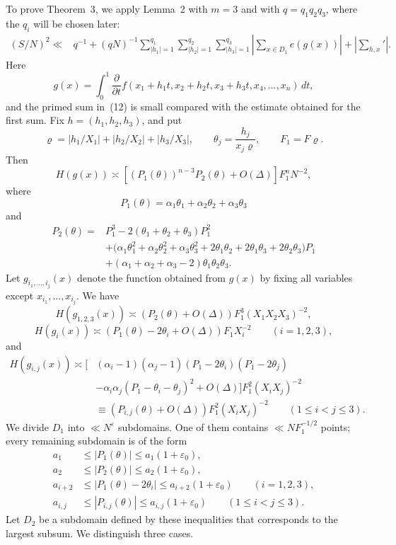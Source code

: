 \documentclass[10pt]{article}
\begin{document}
To prove Theorem~3, we apply Lemma~2 with $m=3$ and with
$q=q_1q_2q_3$, where the $q_i$ will be chosen later:
\begin{equation}
\begin{aligned}
  (S/N)^2\ll{}&q^{-1}+(qN)^{-1}
  \sum_{|h_1|=1}^{q_1}\sum_{|h_2|=1}^{q_2}\sum_{|h_3|=1}^{q_3}
  \left|\sum_{x\in D_1}e(g(x))\right|
  +\left|\sum_{h,x}'\right|.
\end{aligned}
\tag{12}
\end{equation}
Here
\[
  g(x)=\int_0^1\frac{\partial}{\partial t}
  f(x_1+h_1t,x_2+h_2t,x_3+h_3t,x_4,\ldots,x_n)\,dt,
\]
and the primed sum in~(12) is small compared with the estimate obtained for the first sum. Fix $h=(h_1,h_2,h_3)$, and put
\[
  \varrho=|h_1/X_1|+|h_2/X_2|+|h_3/X_3|,
  \qquad \theta_j=\frac{h_j}{x_j\varrho},
  \qquad F_1=F\varrho.
\]
Then
\[
  H(g(x))\asymp
  \left[(P_1(\theta))^{n-3}P_2(\theta)+O(\Delta)\right]F_1^nN^{-2},
\]
where
\[
  P_1(\theta)=\alpha_1\theta_1+\alpha_2\theta_2+\alpha_3\theta_3
\]
and
\[
\begin{aligned}
  P_2(\theta)={}&P_1^3-2(\theta_1+\theta_2+\theta_3)P_1^2\\
  &+\bigl(\alpha_1\theta_1^2+\alpha_2\theta_2^2+\alpha_3\theta_3^2
    +2\theta_1\theta_2+2\theta_1\theta_3+2\theta_2\theta_3\bigr)P_1\\
  &+(\alpha_1+\alpha_2+\alpha_3-2)\theta_1\theta_2\theta_3.
\end{aligned}
\]
Let $g_{i_1,\ldots,i_j}(x)$ denote the function obtained from $g(x)$ by fixing all variables except $x_{i_1},\ldots,x_{i_j}$. We have
\[
  H(g_{1,2,3}(x))\asymp
  (P_2(\theta)+O(\Delta))F_1^3(X_1X_2X_3)^{-2},
\]
\[
  H(g_i(x))\asymp
  (P_1(\theta)-2\theta_i+O(\Delta))F_1X_i^{-2}
  \qquad(i=1,2,3),
\]
and
\[
\begin{aligned}
  H(g_{i,j}(x))\asymp\Big[{}
  &(\alpha_i-1)(\alpha_j-1)(P_1-2\theta_i)(P_1-2\theta_j)\\
  &-\alpha_i\alpha_j(P_1-\theta_i-\theta_j)^2+O(\Delta)
  \Big]F_1^2(X_iX_j)^{-2}\\
  &\equiv(P_{i,j}(\theta)+O(\Delta))F_1^2(X_iX_j)^{-2}
  \qquad(1\leqslant i<j\leqslant3).
\end{aligned}
\]
We divide $D_1$ into $\ll N^\varepsilon$ subdomains. One of them contains $\ll NF_1^{-1/2}$ points; every remaining subdomain is of the form
\[
\begin{aligned}
  a_1&\leqslant|P_1(\theta)|\leqslant a_1(1+\varepsilon_0),\\
  a_2&\leqslant|P_2(\theta)|\leqslant a_2(1+\varepsilon_0),\\
  a_{i+2}&\leqslant|P_1(\theta)-2\theta_i|
    \leqslant a_{i+2}(1+\varepsilon_0)
    \qquad(i=1,2,3),\\
  a_{i,j}&\leqslant|P_{i,j}(\theta)|
    \leqslant a_{i,j}(1+\varepsilon_0)
    \qquad(1\leqslant i<j\leqslant3).
\end{aligned}
\]
Let $D_2$ be a subdomain defined by these inequalities that corresponds to the largest subsum. We distinguish three cases.
\end{document}
